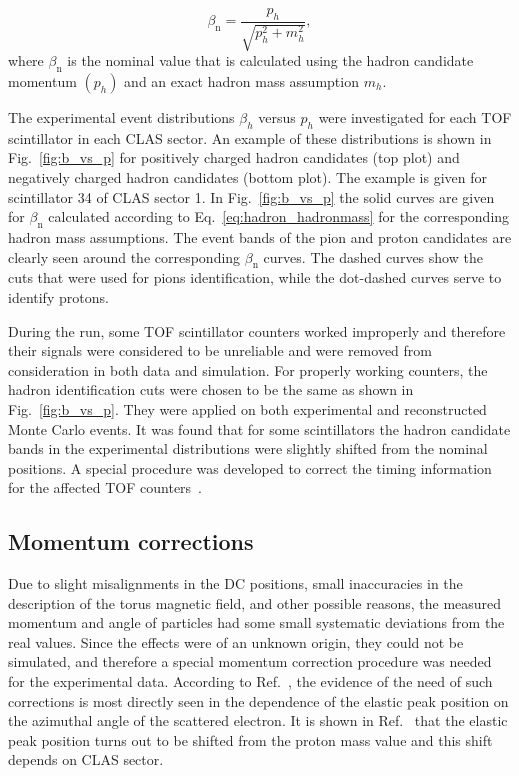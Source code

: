 \documentclass[prc,twocolumn,superscriptaddress,showpacs,amssymb,amsmath,amsfonts,aps,nofootinbib]{revtex4-1}
\begin{document}
\begin{equation}
\beta_{\text{n}}=\frac{p_{h}}{\sqrt{p_{h}^{2}+m_{h}^{2}}},
\label{eq:hadron_hadronmass}
\end{equation}
where $\beta_{\text{n}}$ is the nominal value that is calculated using the hadron candidate momentum $(p_{h})$ and an exact hadron mass assumption $m_{h}$. 






The experimental event distributions $\beta_{h}$ versus $p_{h}$ were investigated for each TOF scintillator in each CLAS sector. An example of these distributions is shown in Fig.~\ref{fig:b_vs_p} for positively charged hadron candidates (top plot) and negatively charged hadron candidates (bottom plot). 
 The example is given for scintillator 34 of CLAS sector 1. In Fig.~\ref{fig:b_vs_p} the solid curves are given for $\beta_{\text{n}}$ calculated according to Eq.~\eqref{eq:hadron_hadronmass} for the corresponding hadron mass assumptions. 
The event bands of the pion and proton candidates are clearly seen around the corresponding $\beta_{\text{n}}$ curves.  
The dashed curves show the cuts that were used for pions identification, while the dot-dashed curves serve to identify protons. 

During the run, some TOF scintillator counters worked improperly and therefore their signals were considered to be unreliable and were removed from consideration in both data and simulation. 
For properly working counters, the hadron identification cuts were chosen to be the same as shown in Fig.~\ref{fig:b_vs_p}. They were applied on both experimental and reconstructed Monte Carlo events. It was found that for some scintillators  the hadron candidate bands in the experimental distributions were slightly shifted from the nominal positions. A special procedure was developed  to correct the timing information for the affected TOF counters~\cite{Fed_an_note:2017}.




\subsection{Momentum corrections}

Due to slight misalignments in the DC positions,  small inaccuracies in
the description of the torus magnetic field, and other possible reasons, the measured momentum and angle of
particles had some small systematic deviations from the real values. 
Since the effects were of an unknown origin, they could not be simulated, and therefore a special  momentum correction procedure was needed for the experimental data. 
According to Ref.~\cite{KPark:momcorr}, the evidence of the need of such corrections is most directly seen in the dependence of the elastic peak position on the azimuthal angle of the scattered electron. It is shown in Ref.~\cite{KPark:momcorr} that the elastic peak position turns out to be shifted from the proton mass value and this shift depends on CLAS sector. 
\end{document}
